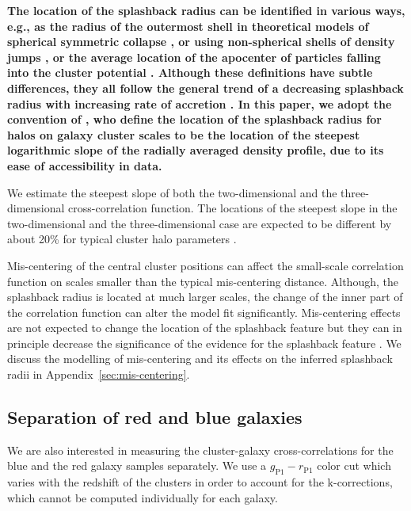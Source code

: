 \documentclass[iop, apjl, twocolappendix, numberedappendix]{emulateapj}
\begin{document}
\textbf{The location of the splashback radius can be identified in various
ways, e.g., as the radius of the outermost shell in theoretical models of
spherical symmetric collapse \citep{adhikari2014splashback, shi2016outer}, or
using non-spherical shells of density jumps \citep{ mansfield2017splashback},
or the average location of the apocenter of particles falling into the cluster
potential \citet{diemer2017splashback}. Although these definitions have subtle
differences, they all follow the general trend of a decreasing splashback
radius with increasing rate of accretion \citep{diemer2017splashback}.
In this paper, we adopt the convention of
\citet{more2015splashback}, who define the location of the splashback radius
for halos on galaxy cluster scales to be the location of the steepest
logarithmic slope of the radially averaged density profile, due to its ease of
accessibility in data.}

We estimate the steepest slope of both the two-dimensional
and the three-dimensional cross-correlation function. The
locations of the steepest slope in the two-dimensional and the
three-dimensional case are expected to be different by
about 20\% for typical cluster halo parameters
\citep{diemer2014dependence, more2016detection}.

Mis-centering of the central cluster positions can affect the
small-scale correlation function on scales smaller than the typical
mis-centering distance.  Although, the splashback radius is located at
much larger scales, the change of the inner part of the correlation
function can alter the model fit significantly.  Mis-centering effects
are not expected to change the location of the splashback feature but
they can in principle decrease the significance of the evidence for
the splashback feature \citep{baxter2017halo}.  We discuss the
modelling of mis-centering and its effects on the inferred splashback
radii in Appendix~\ref{sec:mis-centering}.

\subsection{Separation of red and blue galaxies}
\label{sec:Color}

We are also interested in measuring the cluster-galaxy
cross-correlations for the blue and the red galaxy samples
separately. We use a $g_{\mathrm{P1}}-r_{\mathrm{P1}}$ color cut
which varies with the redshift of the clusters in order to account
for the k-corrections, which cannot be computed individually for
each galaxy.
\end{document}
